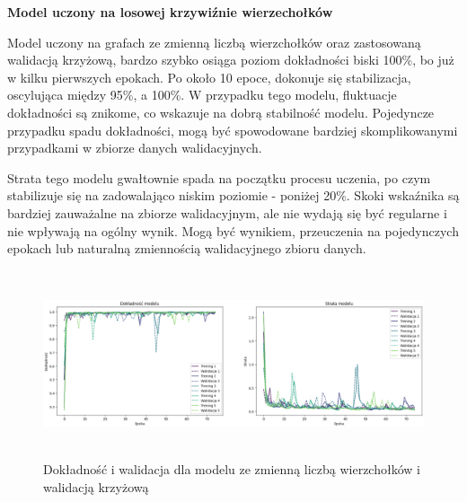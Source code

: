 


\textbf{Model uczony na losowej krzywiźnie wierzechołków}

Model uczony na grafach ze zmienną liczbą wierzchołków oraz zastosowaną walidacją krzyżową,
bardzo szybko osiąga poziom dokładności biski 100\%, bo już w kilku pierwszych epokach.
Po około 10 epoce, dokonuje się stabilizacja, oscylująca między 95\%, a 100\%.
W przypadku tego modelu, fluktuacje dokładności są znikome, co wskazuje na dobrą stabilność modelu.
Pojedyncze przypadku spadu dokładności, mogą być spowodowane bardziej skomplikowanymi
przypadkami w zbiorze danych walidacyjnych.

Strata tego modelu gwałtownie spada na początku procesu uczenia,
po czym stabilizuje się na zadowalająco niskim poziomie - poniżej 20\%.
Skoki wskaźnika są bardziej zauważalne na zbiorze walidacyjnym,
ale nie wydają się być regularne i nie wpływają na ogólny wynik.
Mogą być wynikiem, przeuczenia na pojedynczych epokach lub naturalną zmiennością walidacyjnego zbioru danych.

\begin{figure}[ht]
	\centering
	\includegraphics[height=5.5cm]{resources/tests/images/v3/multiple_edges_crossvalid_img.png}
	\caption{Dokładność i walidacja dla modelu ze zmienną liczbą wierzchołków i walidacją krzyżową}
	\label{Fig:tests-csvar-1}
\end{figure}
\FloatBarrier

